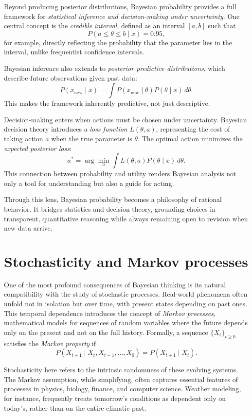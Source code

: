 \documentclass{book}
\begin{document}
Beyond producing posterior distributions, Bayesian probability provides a full framework for \textit{statistical inference and decision-making under uncertainty}. One central concept is the \textit{credible interval}, defined as an interval $[a, b]$ such that
\[
P(a \leq \theta \leq b \mid x) = 0.95 ,
\]
for example, directly reflecting the probability that the parameter lies in the interval, unlike frequentist confidence intervals.

Bayesian inference also extends to \textit{posterior predictive distributions}, which describe future observations given past data:
\[
P(x_{\text{new}} \mid x) = \int P(x_{\text{new}} \mid \theta) P(\theta \mid x) \, d\theta .
\]
This makes the framework inherently predictive, not just descriptive.

Decision-making enters when actions must be chosen under uncertainty. Bayesian decision theory introduces a \textit{loss function} $L(\theta, a)$, representing the cost of taking action $a$ when the true parameter is $\theta$. The optimal action minimizes the \textit{expected posterior loss}:
\[
a^* = \arg \min_a \int L(\theta, a) P(\theta \mid x) \, d\theta .
\]
This connection between probability and utility renders Bayesian analysis not only a tool for understanding but also a guide for acting.

Through this lens, Bayesian probability becomes a philosophy of rational behavior. It bridges statistics and decision theory, grounding choices in transparent, quantitative reasoning while always remaining open to revision when new data arrive.

\section{Stochasticity and Markov processes}

One of the most profound consequences of Bayesian thinking is its natural compatibility with the study of stochastic processes. Real-world phenomena often unfold not in isolation but over time, with present states depending on past ones. This temporal dependence introduces the concept of \textit{Markov processes}, mathematical models for sequences of random variables where the future depends only on the present and not on the full history. Formally, a sequence $\{X_t\}_{t \geq 0}$ satisfies the \textit{Markov property} if
\[
P(X_{t+1} \mid X_t, X_{t-1}, \dots, X_0) = P(X_{t+1} \mid X_t) .
\]

Stochasticity here refers to the intrinsic randomness of these evolving systems. The Markov assumption, while simplifying, often captures essential features of processes in physics, biology, finance, and computer science. Weather modeling, for instance, frequently treats tomorrow’s conditions as dependent only on today’s, rather than on the entire climatic past.
\end{document}
